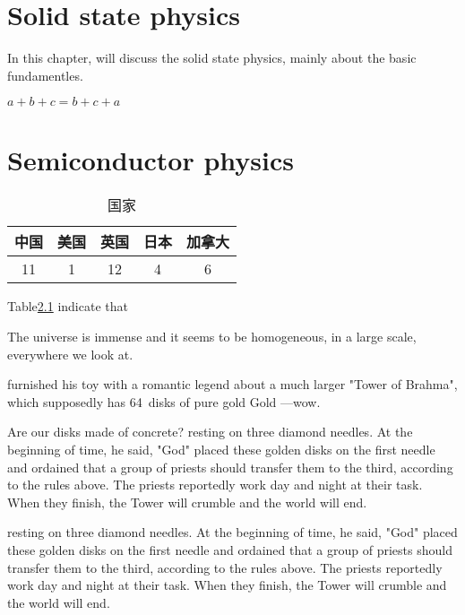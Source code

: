 \chapter{Solid state physics}
\label{Solid state physics}
In this chapter, will discuss the solid state physics, mainly about the basic fundamentles.

\begin{math}
	a + b + c = b + c + a
\end{math}

\begin{figure}

\end{figure}



\chapter{Semiconductor physics}
\label{Semiconductor physics}

	\begin{table}[H]
		\centering
		\caption{国家}
		\begin{tabular}{|c|c|c|c|c|}
			\hline
			中国 &美国 &英国 &日本&加拿大\\
			\hline
			11&1&12&4&6\\
			\hline
		\end{tabular}
		\label{tab2}    
	\end{table}
	
	Table\ref{tab2} indicate that
	
	The universe is immense and it seems to be homogeneous, 
	in a large scale, everywhere we look at.
	
	furnished his toy with a romantic legend about a much larger
	"Tower of Brahma", which supposedly has 64~disks of pure gold
	Gold ---wow.\par Are our disks made of concrete? 
	resting on three diamond needles. At the beginning of time, he said,
	"God" placed these golden disks on the first needle and ordained that a
	group of priests should transfer them to the third, according to the
	rules above. The priests reportedly work day and night at their task.
	When they finish, the Tower will crumble and the world will end.
	
	resting on three diamond needles. At the beginning of time, he said,
	"God" placed these golden disks on the first needle and ordained that a
	group of priests should transfer them to the third, according to the
	rules above. The priests reportedly work day and night at their task.
	When they finish, the Tower will crumble and the world will end.